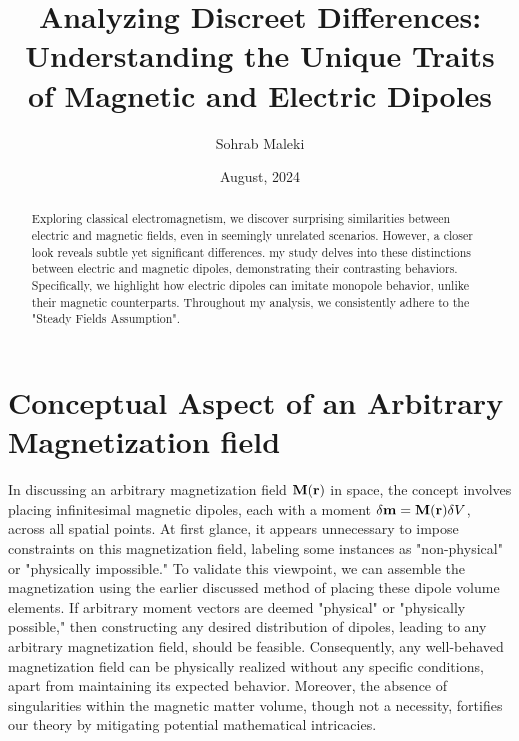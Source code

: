 \documentclass{article}
\numberwithin{equation}{section}
\begin{document}
\title{Analyzing Discreet Differences: Understanding the Unique Traits of Magnetic and Electric Dipoles}
\author{Sohrab Maleki}
\date{August, 2024}
\maketitle

\begin{abstract}
Exploring classical electromagnetism, we discover surprising similarities between electric and magnetic fields, even in seemingly unrelated scenarios. However, a closer look reveals subtle yet significant differences. my study delves into these distinctions between electric and magnetic dipoles, demonstrating their contrasting behaviors. Specifically, we highlight how electric dipoles can imitate monopole behavior, unlike their magnetic counterparts. Throughout my analysis, we consistently adhere to the "Steady Fields Assumption".
\end{abstract}

\section{Conceptual Aspect of an Arbitrary Magnetization field}\label{subsec:ss1}
In discussing an arbitrary magnetization field $\vb{M}(\vb{r})$ in space, the concept involves placing infinitesimal magnetic dipoles, each with a moment $\vb{\delta m}=\vb{M}(\vb{r})\delta V$, across all spatial points. At first glance, it appears unnecessary to impose constraints on this magnetization field, labeling some instances as "non-physical" or "physically impossible." To validate this viewpoint, we can assemble the magnetization using the earlier discussed method of placing these dipole volume elements. If arbitrary moment vectors are deemed "physical" or "physically possible," then constructing any desired distribution of dipoles, leading to any arbitrary magnetization field, should be feasible. Consequently, any well-behaved magnetization field can be physically realized without any specific conditions, apart from maintaining its expected behavior. Moreover, the absence of singularities within the magnetic matter volume, though not a necessity, fortifies our theory by mitigating potential mathematical intricacies.
\end{document}
